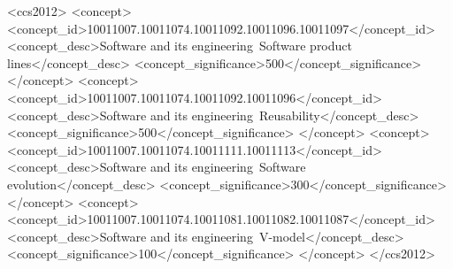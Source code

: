 \documentclass[sigconf]{acmart}
\begin{document}
\begin{CCSXML}
 <ccs2012>
    <concept>
        <concept_id>10011007.10011074.10011092.10011096.10011097</concept_id>
        <concept_desc>Software and its engineering~Software product lines</concept_desc>
        <concept_significance>500</concept_significance>
    </concept>
    <concept>
        <concept_id>10011007.10011074.10011092.10011096</concept_id>
        <concept_desc>Software and its engineering~Reusability</concept_desc>
        <concept_significance>500</concept_significance>
    </concept>
    <concept>
        <concept_id>10011007.10011074.10011111.10011113</concept_id>
        <concept_desc>Software and its engineering~Software evolution</concept_desc>
        <concept_significance>300</concept_significance>
    </concept>
    <concept>
        <concept_id>10011007.10011074.10011081.10011082.10011087</concept_id>
        <concept_desc>Software and its engineering~V-model</concept_desc>
        <concept_significance>100</concept_significance>
    </concept>
</ccs2012>
\end{CCSXML}





\maketitle






\balance{}




\end{document}
